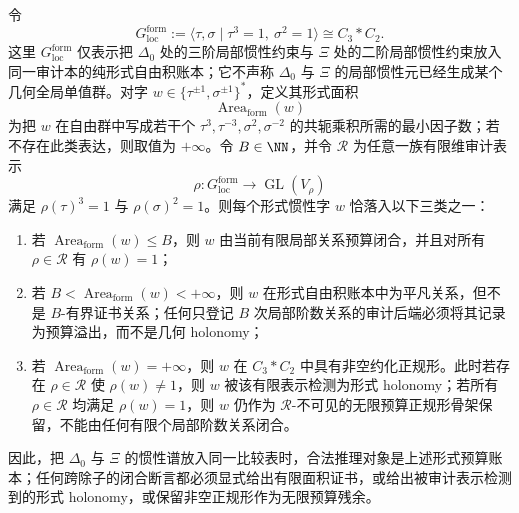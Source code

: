 \begin{theorem}\label{distill:gromov-filling_budget_closure_families-conclusion-formal-local-inertia-dehn-ledger}
令
\[
G_{\mathrm{loc}}^{\mathrm{form}}
:=\langle \tau,\sigma\mid \tau^3=1,\ \sigma^2=1\rangle
\cong C_3\ast C_2.
\]
这里 \(G_{\mathrm{loc}}^{\mathrm{form}}\) 仅表示把 \(\Delta_0\) 处的三阶局部惯性约束与 \(\Xi\) 处的二阶局部惯性约束放入同一审计本的纯形式自由积账本；它不声称 \(\Delta_0\) 与 \(\Xi\) 的局部惯性元已经生成某个几何全局单值群。对字 \(w\in\{\tau^{\pm1},\sigma^{\pm1}\}^\ast\)，定义其形式面积
\[
\operatorname{Area}_{\mathrm{form}}(w)
\]
为把 \(w\) 在自由群中写成若干个 \(\tau^3,\tau^{-3},\sigma^2,\sigma^{-2}\) 的共轭乘积所需的最小因子数；若不存在此类表达，则取值为 \(+\infty\)。令 \(B\in\NN\)，并令 \(\mathscr R\) 为任意一族有限维审计表示
\[
\rho:G_{\mathrm{loc}}^{\mathrm{form}}\longrightarrow \operatorname{GL}(V_\rho)
\]
满足 \(\rho(\tau)^3=1\) 与 \(\rho(\sigma)^2=1\)。则每个形式惯性字 \(w\) 恰落入以下三类之一：
\begin{enumerate}
  \item 若 \(\operatorname{Area}_{\mathrm{form}}(w)\le B\)，则 \(w\) 由当前有限局部关系预算闭合，并且对所有 \(\rho\in\mathscr R\) 有 \(\rho(w)=1\)；
  \item 若 \(B<\operatorname{Area}_{\mathrm{form}}(w)<+\infty\)，则 \(w\) 在形式自由积账本中为平凡关系，但不是 \(B\)-有界证书关系；任何只登记 \(B\) 次局部阶数关系的审计后端必须将其记录为预算溢出，而不是几何 holonomy；
  \item 若 \(\operatorname{Area}_{\mathrm{form}}(w)=+\infty\)，则 \(w\) 在 \(C_3\ast C_2\) 中具有非空约化正规形。此时若存在 \(\rho\in\mathscr R\) 使 \(\rho(w)\ne1\)，则 \(w\) 被该有限表示检测为形式 holonomy；若所有 \(\rho\in\mathscr R\) 均满足 \(\rho(w)=1\)，则 \(w\) 仍作为 \(\mathscr R\)-不可见的无限预算正规形骨架保留，不能由任何有限个局部阶数关系闭合。
\end{enumerate}
因此，把 \(\Delta_0\) 与 \(\Xi\) 的惯性谱放入同一比较表时，合法推理对象是上述形式预算账本；任何跨除子的闭合断言都必须显式给出有限面积证书，或给出被审计表示检测到的形式 holonomy，或保留非空正规形作为无限预算残余。
\end{theorem}
